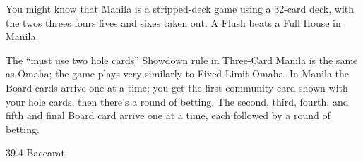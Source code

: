 You might know that Manila is a stripped-deck game using a 32-card
deck, with the twos threes fours fives and sixes taken out. A Flush
beats a Full House in Manila.

The ``must use two hole cards'' Showdown rule in Three-Card Manila is
the same as Omaha; the game plays very similarly to Fixed Limit
Omaha. In Manila the Board cards arrive one at a time; you get the
first community card shown with your hole cards, then there's a round
of betting. The second, third, fourth, and fifth and final Board card
arrive one at a time, each followed by a round of betting.

39.4 Baccarat.
